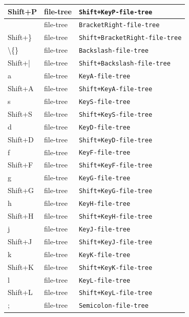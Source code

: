 \documentclass[11pt, a4paper]{article}
\begin{document}
\begin{appendices}
\begin{longtable}{|p{}|p{}|p{}|}
    Shift+P & file-tree & \texttt{Shift+KeyP-file-tree} \\ \hline
    [ & file-tree & \texttt{BracketLeft-file-tree} \\ \hline
    Shift+\{ & file-tree & \texttt{Shift+BracketLeft-file-tree} \\ \hline
    ] & file-tree & \texttt{BracketRight-file-tree} \\ \hline
    Shift+\} & file-tree & \texttt{Shift+BracketRight-file-tree} \\ \hline
    \textbackslash\{\} & file-tree & \texttt{Backslash-file-tree} \\ \hline
    Shift+| & file-tree & \texttt{Shift+Backslash-file-tree} \\ \hline
    a & file-tree & \texttt{KeyA-file-tree} \\ \hline
    Shift+A & file-tree & \texttt{Shift+KeyA-file-tree} \\ \hline
    s & file-tree & \texttt{KeyS-file-tree} \\ \hline
    Shift+S & file-tree & \texttt{Shift+KeyS-file-tree} \\ \hline
    d & file-tree & \texttt{KeyD-file-tree} \\ \hline
    Shift+D & file-tree & \texttt{Shift+KeyD-file-tree} \\ \hline
    f & file-tree & \texttt{KeyF-file-tree} \\ \hline
    Shift+F & file-tree & \texttt{Shift+KeyF-file-tree} \\ \hline
    g & file-tree & \texttt{KeyG-file-tree} \\ \hline
    Shift+G & file-tree & \texttt{Shift+KeyG-file-tree} \\ \hline
    h & file-tree & \texttt{KeyH-file-tree} \\ \hline
    Shift+H & file-tree & \texttt{Shift+KeyH-file-tree} \\ \hline
    j & file-tree & \texttt{KeyJ-file-tree} \\ \hline
    Shift+J & file-tree & \texttt{Shift+KeyJ-file-tree} \\ \hline
    k & file-tree & \texttt{KeyK-file-tree} \\ \hline
    Shift+K & file-tree & \texttt{Shift+KeyK-file-tree} \\ \hline
    l & file-tree & \texttt{KeyL-file-tree} \\ \hline
    Shift+L & file-tree & \texttt{Shift+KeyL-file-tree} \\ \hline
    ; & file-tree & \texttt{Semicolon-file-tree} \\ \hline

\end{longtable}
\end{appendices}
\end{document}
